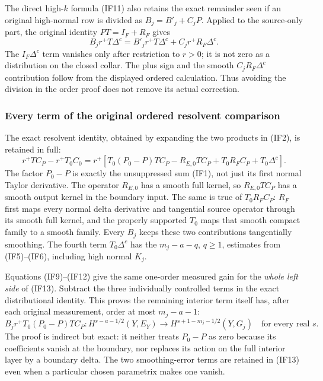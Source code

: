 \documentclass[
  11pt,
]{article}
\begin{document}
The direct high-\(k\) formula (IF11) also retains the exact remainder
seen if an original high-normal row is divided as \(B_j=B'_j+C_jP\).
Applied to the source-only part, the original identity \(PT=I_F+R_F\)
gives \[
 B_jr^+T\Delta^c
 =B'_jr^+T\Delta^c+C_jr^+R_F\Delta^c .
 \tag{IF12a}
\] The \(I_F\Delta^c\) term vanishes only after restriction to \(r>0\);
it is not zero as a distribution on the closed collar. The plus sign and
the smooth \(C_jR_F\Delta^c\) contribution follow from the displayed
ordered calculation. Thus avoiding the division in the order proof does
not remove its actual correction.

\subsubsection{Every term of the original ordered resolvent
comparison}\label{every-term-of-the-original-ordered-resolvent-comparison}

The exact resolvent identity, obtained by expanding the two products in
(IF2), is retained in full: \[
 r^+TC_P-r^+T_0C_0
 =r^+\!\left[
    T_0(P_0-P)TC_P
    -R_{E,0}TC_P
    +T_0R_FC_P
    +T_0\Delta^c\right].
 \tag{IF13}
\] The factor \(P_0-P\) is exactly the unsuppressed sum (IF1), not just
its first normal Taylor derivative. The operator \(R_{E,0}\) has a
smooth full kernel, so \(R_{E,0}TC_P\) has a smooth output kernel in the
boundary input. The same is true of \(T_0R_FC_P\): \(R_F\) first maps
every normal delta derivative and tangential source operator through its
smooth full kernel, and the properly supported \(T_0\) maps that smooth
compact family to a smooth family. Every \(B_j\) keeps these two
contributions tangentially smoothing. The fourth term \(T_0\Delta^c\)
has the \(m_j-a-q\), \(q\geq1\), estimates from (IF5)--(IF6), including
high normal \(K_j\).

Equations (IF9)--(IF12) give the same one-order measured gain for the
\emph{whole left side} of (IF13). Subtract the three individually
controlled terms in the exact distributional identity. This proves the
remaining interior term itself has, after each original measurement,
order at most \(m_j-a-1\): \[
 B_jr^+T_0(P_0-P)TC_P:
 H^{s-a-1/2}(Y,E_Y)
 \longrightarrow H^{s+1-m_j-1/2}(Y,G_j)
 \quad\text{for every real }s .
 \tag{IF14}
\] The proof is indirect but exact: it neither treats \(P_0-P\) as zero
because its coefficients vanish at the boundary, nor replaces its action
on the full interior layer by a boundary delta. The two smoothing-error
terms are retained in (IF13) even when a particular chosen parametrix
makes one vanish.
\end{document}
